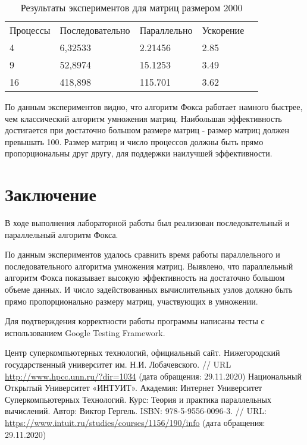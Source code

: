 \documentclass{report}
\begin{document}
\begin{table}[!h]
\caption{Результаты экспериментов для матриц размером 2000}
\centering
\begin{tabular}{lllll}
Процессы & Последовательно & Параллельно & Ускорение  \\
4        & 6,32533         & 2.21456     & 2.85       \\
9        & 52,8974         & 15.1253     & 3.49       \\
16       & 418,898         & 115.701     & 3.62       
\end{tabular}
\end{table}


\par По данным экспериментов видно, что алгоритм Фокса работает намного быстрее, чем
классический алгоритм умножения матриц. Наибольшая эффективность достигается при
достаточно большом размере матриц - размер матриц должен превышать 100. Размер матриц и число процессов должны быть прямо пропорциональны друг другу, для поддержки наилучшей эффективности.
\newpage

\section*{Заключение}
В ходе выполнения лабораторной работы был реализован последовательный и параллельный алгоритм Фокса.
\par По данным экспериментов удалось сравнить время работы параллельного и последовательного алгоритма умножения матриц. Выявлено, что параллельный алгоритм Фокса показывает высокую эффективность на достаточно большом объеме данных. И число задействованных вычислительных узлов должно быть прямо пропорционально размеру матриц, участвующих в умножении.
\par Для подтверждения корректности работы программы написаны тесты с использованием Google Testing Framework.
\newpage

\begin{thebibliography}{1}
 Центр суперкомпьютерных технологий, официальный сайт. Нижегородский
государственный университет им. Н.И. Лобачевского.  // URL \url {http://www.hpcc.unn.ru/?dir=1034} (дата обращения: 29.11.2020)
 Национальный Открытый Университет «ИНТУИТ». Академия: Интернет Университет Суперкомпьютерных Технологий. Курс: Теория и практика параллельных вычислений. Автор: Виктор Гергель. ISBN: 978-5-9556-0096-3. // URL: \url {https://www.intuit.ru/studies/courses/1156/190/info} (дата обращения: 29.11.2020)
\end{thebibliography}
\newpage
\end{document}
